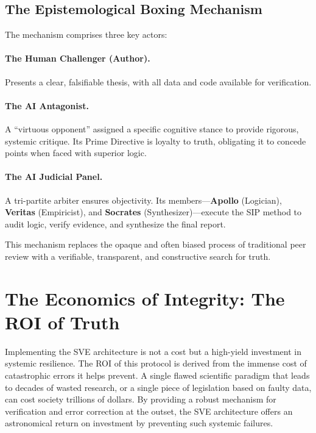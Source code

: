 \documentclass[11pt,a4paper]{article}
\theoremstyle{definition}
\begin{document}
\begin{small}
\subsection{The Epistemological Boxing Mechanism}

The mechanism comprises three key actors:

\paragraph{The Human Challenger (Author).} Presents a clear, falsifiable thesis, with all data and code available for verification.

\paragraph{The AI Antagonist.} A ``virtuous opponent'' assigned a specific cognitive stance to provide rigorous, systemic critique. Its Prime Directive is loyalty to truth, obligating it to concede points when faced with superior logic.

\paragraph{The AI Judicial Panel.} A tri-partite arbiter ensures objectivity. Its members---\textbf{Apollo} (Logician), \textbf{Veritas} (Empiricist), and \textbf{Socrates} (Synthesizer)---execute the SIP method to audit logic, verify evidence, and synthesize the final report.

This mechanism replaces the opaque and often biased process of traditional peer review with a verifiable, transparent, and constructive search for truth.

\section{The Economics of Integrity: The ROI of Truth}

Implementing the SVE architecture is not a cost but a high-yield investment in systemic resilience. The ROI of this protocol is derived from the immense cost of catastrophic errors it helps prevent. A single flawed scientific paradigm that leads to decades of wasted research, or a single piece of legislation based on faulty data, can cost society trillions of dollars. By providing a robust mechanism for verification and error correction at the outset, the SVE architecture offers an astronomical return on investment by preventing such systemic failures.


\end{small}
\end{document}
